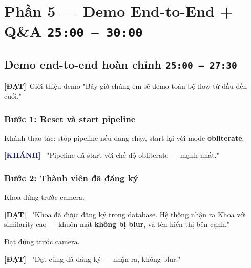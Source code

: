 \documentclass[12pt, a4paper]{article}
\newcommand{\timing}[1]{%
  \hfill\colorbox{NavyBlue!20}{\texttt{\small #1}}%
}
\newcommand{\dat}{\textcolor{BrickRed}{\textbf{[ĐẠT]}}}
\newcommand{\khanh}{\textcolor{MidnightBlue}{\textbf{[KHÁNH]}}}
\begin{document}
\section{Phần 5 — Demo End-to-End + Q\&A \timing{25:00 – 30:00}}

\subsection{Demo end-to-end hoàn chỉnh \timing{25:00 – 27:30}}

\begin{dialog}{\dat\ Giới thiệu demo}
"Bây giờ chúng em sẽ demo toàn bộ flow từ đầu đến cuối."
\end{dialog}

\subsubsection*{Bước 1: Reset và start pipeline}

\begin{action}
Khánh thao tác: stop pipeline nếu đang chạy, start lại với mode \textbf{obliterate}.
\end{action}

\begin{dialog}{\khanh\ }
"Pipeline đã start với chế độ obliterate --- mạnh nhất."
\end{dialog}

\subsubsection*{Bước 2: Thành viên đã đăng ký}

\begin{action}
Khoa đứng trước camera.
\end{action}

\begin{dialog}{\dat\ }
"Khoa đã được đăng ký trong database.
Hệ thống nhận ra Khoa với similarity cao ---
khuôn mặt \textbf{không bị blur}, và tên hiển thị bên cạnh."
\end{dialog}

\begin{action}
Đạt đứng trước camera.
\end{action}

\begin{dialog}{\dat\ }
"Đạt cũng đã đăng ký --- nhận ra, không blur."
\end{dialog}
\end{document}
